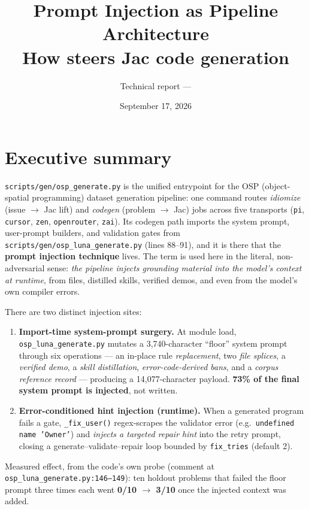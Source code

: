 \documentclass[11pt]{article}
\title{\textbf{Prompt Injection as Pipeline Architecture}\\[2mm]
\large How \file{scripts/gen/osp\_generate.py} steers Jac code generation}
\author{Technical report --- \file{jac\_llm\_data}}
\date{September 17, 2026}
\newcommand{\file}[1]{\texttt{#1}}
\newcommand{\code}[1]{\texttt{#1}}
\begin{document}
\maketitle

\section{Executive summary}

\file{scripts/gen/osp\_generate.py} is the unified entrypoint for the OSP
(object-spatial programming) dataset generation pipeline: one command routes
\emph{idiomize} (issue $\rightarrow$ Jac lift) and \emph{codegen} (problem
$\rightarrow$ Jac) jobs across five transports (\code{pi}, \code{cursor},
\code{zen}, \code{openrouter}, \code{zai}). Its codegen path imports the
system prompt, user-prompt builders, and validation gates from
\file{scripts/gen/osp\_luna\_generate.py} (lines 88--91), and it is there that
the \textbf{prompt injection technique} lives. The term is used here in the
literal, non-adversarial sense: \emph{the pipeline injects grounding material
into the model's context at runtime}, from files, distilled skills, verified
demos, and even from the model's own compiler errors.

There are two distinct injection sites:

\begin{enumerate}
  \item \textbf{Import-time system-prompt surgery.} At module load,
  \file{osp\_luna\_generate.py} mutates a 3{,}740-character ``floor'' system
  prompt through six operations --- an in-place rule \emph{replacement}, two
  \emph{file splices}, a \emph{verified demo}, a \emph{skill distillation},
  \emph{error-code-derived bans}, and a \emph{corpus reference record} ---
  producing a 14{,}077-character payload. \textbf{73\% of the final system
  prompt is injected}, not written.
  \item \textbf{Error-conditioned hint injection (runtime).} When a generated
  program fails a gate, \code{\_fix\_user()} regex-scrapes the validator error
  (e.g.\ \code{undefined name 'Owner'}) and \emph{injects a targeted repair
  hint} into the retry prompt, closing a generate--validate--repair loop
  bounded by \code{fix\_tries} (default 2).
\end{enumerate}

Measured effect, from the code's own probe (comment at
\file{osp\_luna\_generate.py:146--149}): ten holdout problems that failed the
floor prompt three times each went \textbf{0/10 $\rightarrow$ 3/10} once the
injected context was added.
\end{document}
